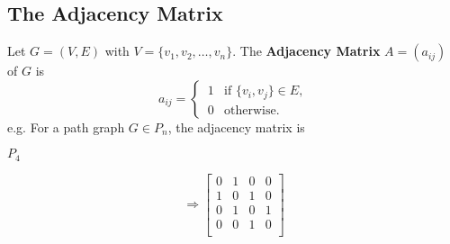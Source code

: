 \documentclass[11pt]{article}
\begin{document}
\subsection{The Adjacency Matrix}
Let $G = (V,E)$ with $V = \{v_1, v_2, \dots, v_n\}$. The \textbf{Adjacency Matrix} $A=(a_{ij})$ of $G$ is
\[
    a_{ij} = 
    \begin{cases}
        \displaystyle
        \,1 & \text{if } \{v_i,v_j\}\in E,\\
        \displaystyle
        \,0 & \text{otherwise}.
    \end{cases}
\]
e.g. For a path graph $G \in P_n$, the adjacency matrix is 
\newline
\begin{minipage}{\textwidth}
    \centering
    \begin{minipage}[][70pt][c]{.3\textwidth}
        $P_4\,$ 
        \centering
    \end{minipage}
    \begin{minipage}[m][70pt][c]{.2\textwidth}
    \vfill
    \[
        \Rightarrow
        \begin{bmatrix}
            0 & 1 & 0 & 0\\
            1 & 0 & 1 & 0\\
            0 & 1 & 0 & 1\\
            0 & 0 & 1 & 0\\
        \end{bmatrix}
    \]
    \vfill
    \end{minipage}
\end{minipage}
\end{document}
